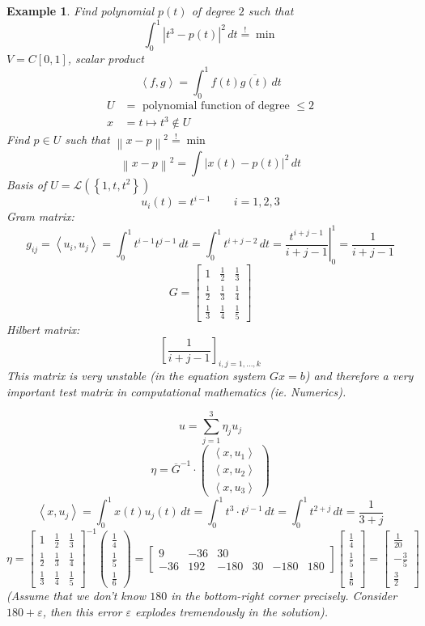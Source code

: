 \documentclass{article}
\newtheorem{example}{Example}  \numberwithin{example}{section}
\newcommand{\set}[1]{\left\{#1\right\}}
\newcommand{\ip}[2]{\left\langle#1,#2\right\rangle} %
\newcommand{\norm}[1]{\left\|#1\right\|}
\newcommand{\card}[1]{\left|#1\right|}
\begin{document}
\begin{example} %
  \label{ex855}
  Find polynomial $p(t)$ of degree $2$ such that
  \[ \int_0^1 \card{t^3 - p(t)}^2 \, dt \overset!= \min \]
  $V = C[0,1]$, scalar product
  \[ \ip{f}{g} = \int_0^1 f(t) \overline{g(t)} \, dt \]
  \begin{align*}
    U &= \text{ polynomial function of degree } \leq 2 \\
    x &= t \mapsto t^3 \not\in U
  \end{align*}
  Find $p \in U$ such that $\norm{x - p}^2 \overset!= \min$
  \[ \norm{x - p}^2 = \int \card{x(t) - p(t)}^2 \, dt \]
  Basis of $U = \mathcal L(\set{1, t, t^2})$
  \[ u_i(t) = t^{i-1} \qquad i = 1,2,3 \]
  Gram matrix:
  \[ g_{ij} = \ip{u_i}{u_j} = \int_0^1 t^{i-1} t^{j-1} \, dt = \int_0^1 t^{i+j-2} \, dt = \left. \frac{t^{i+j-1}}{i + j - 1} \right|_0^1 = \frac{1}{i + j - 1} \]
  \[
    G = \begin{bmatrix}
      1 & \frac12 & \frac13 \\
      \frac12 & \frac13 & \frac14 \\
      \frac13 & \frac14 & \frac15
    \end{bmatrix}
  \]
  Hilbert matrix:
  \[ \left[\frac{1}{i+j-1}\right]_{i,j=1,\ldots,k} \]
  This matrix is very unstable (in the equation system $Gx = b$) and therefore a very important test matrix in computational mathematics (ie. Numerics).

  \[ u = \sum_{j=1}^3 \eta_j u_j \]
  \[ \eta = \overline{G}^{-1} \cdot \begin{pmatrix} \ip{x}{u_1} \\ \ip{x}{u_2} \\ \ip{x}{u_3} \end{pmatrix} \]
  \[ \ip{x}{u_j} = \int_0^1 x(t) u_j(t) \, dt = \int_0^1 t^3 \cdot t^{j-1} \, dt = \int_0^1 t^{2 + j} \, dt = \frac{1}{3 + j} \]
  \[
    \eta = \begin{bmatrix} 1 & \frac12 & \frac13 \\ \frac12 & \frac13 & \frac14 \\ \frac13 & \frac14 & \frac15 \end{bmatrix}^{-1}
    \begin{pmatrix} \frac14 \\ \frac15 \\ \frac16 \end{pmatrix}
    = \begin{bmatrix} 9 & -36 & 30 \\ -36 & 192 & -180 & 30 & -180 & 180 \end{bmatrix}
    \begin{bmatrix} \frac14 \\ \frac15 \\ \frac16 \end{bmatrix}
    = \begin{bmatrix} \frac1{20} \\ -\frac35 \\ \frac32 \end{bmatrix}
  \]
  (Assume that we don't know $180$ in the bottom-right corner precisely. Consider $180+\varepsilon$, then this error $\varepsilon$ explodes tremendously in the solution).
\end{example}
\end{document}
